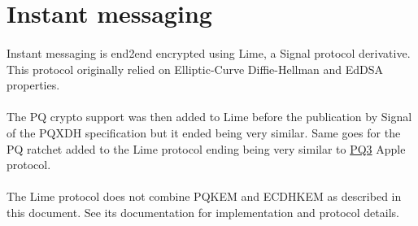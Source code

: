 \documentclass[a4paper,11pt]{article}
\begin{document}
\newpage
\section{Instant messaging}
\paragraph*{}Instant messaging is end2end encrypted using Lime\citep{lime}, a Signal protocol derivative. This protocol originally relied on Elliptic-Curve Diffie-Hellman and EdDSA properties.
\paragraph*{}The PQ crypto support was then added to Lime before the publication by Signal of the PQXDH specification but it ended being very similar. Same goes for the PQ ratchet added to the Lime protocol ending being very similar to \href{https://security.apple.com/blog/imessage-pq3/}{PQ3} Apple protocol.
\paragraph*{}The Lime protocol does not combine PQKEM and ECDHKEM as described in this document. See its documentation for implementation and protocol details.
\newpage



\end{document}
